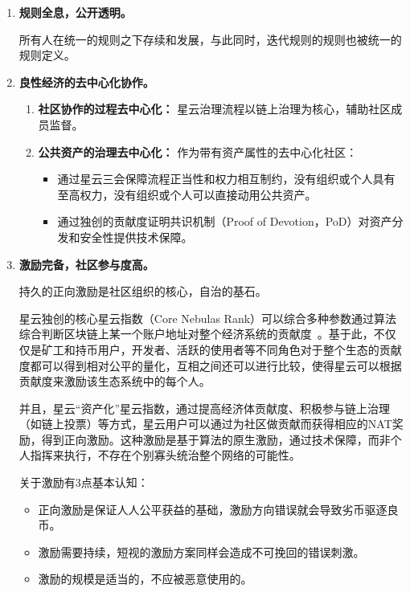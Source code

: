 \begin{enumerate}
	\item 

	\textbf{规则全息，公开透明。} 

	所有人在统一的规则之下存续和发展，与此同时，迭代规则的规则也被统一的规则定义。


	\item 

	\textbf{良性经济的去中心化协作。}

	\begin{enumerate}
		\item 

		\textbf{社区协作的过程去中心化：} 星云治理流程以链上治理为核心，辅助社区成员监督。
	
		\item 

		\textbf{公共资产的治理去中心化：} 作为带有资产属性的去中心化社区：

		\begin{itemize}
			\item 通过星云三会保障流程正当性和权力相互制约，没有组织或个人具有至高权力，没有组织或个人可以直接动用公共资产。
			\item 通过独创的贡献度证明共识机制（Proof of Devotion，PoD）对资产分发和安全性提供技术保障。
		\end{itemize}

	\end{enumerate}

	\item 

	\textbf{激励完备，社区参与度高。}
	
	持久的正向激励是社区组织的核心，自治的基石。

	星云独创的核心星云指数（Core Nebulas Rank）可以综合多种参数通过算法综合判断区块链上某一个账户地址对整个经济系统的贡献度~\cite{yellowpaper}。基于此，不仅仅是矿工和持币用户，开发者、活跃的使用者等不同角色对于整个生态的贡献度都可以得到相对公平的量化，互相之间还可以进行比较，使得星云可以根据贡献度来激励该生态系统中的每个人。

	并且，星云“资产化”星云指数，通过提高经济体贡献度、积极参与链上治理（如链上投票）等方式，星云用户可以通过为社区做贡献而获得相应的NAT奖励，得到正向激励。这种激励是基于算法的原生激励，通过技术保障，而非个人指挥来执行，不存在个别寡头统治整个网络的可能性。

	关于激励有3点基本认知：

	\begin{itemize}
		\item 正向激励是保证人人公平获益的基础，激励方向错误就会导致劣币驱逐良币。
		\item 激励需要持续，短视的激励方案同样会造成不可挽回的错误刺激。
		\item 激励的规模是适当的，不应被恶意使用的。
	\end{itemize}


\end{enumerate}
